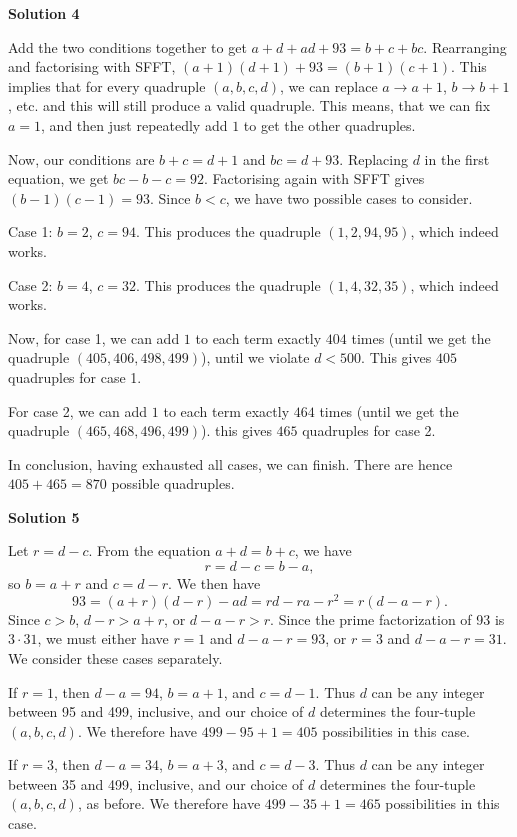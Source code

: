 \begin{enumerate}
\textbf{Solution 4}

Add the two conditions together to get $a+d+ad+93=b+c+bc$. Rearranging and factorising with SFFT, $(a+1)(d+1)+93=(b+1)(c+1)$. This implies that for every quadruple $(a,b,c,d)$, we can replace $a\longrightarrow a+1$, $b\longrightarrow b+1$, etc. and this will still produce a valid quadruple. This means, that we can fix $a=1$, and then just repeatedly add $1$ to get the other quadruples. 

 Now, our conditions are $b+c=d+1$ and $bc=d+93$. Replacing $d$ in the first equation, we get $bc-b-c=92$. Factorising again with SFFT gives $(b-1)(c-1)=93$. Since $b<c$, we have two possible cases to consider.

 Case 1: $b=2$, $c=94$. This produces the quadruple $(1,2,94,95)$, which indeed works.

 Case 2: $b=4$, $c=32$. This produces the quadruple $(1,4,32,35)$, which indeed works. 

 Now, for case 1, we can add $1$ to each term exactly $404$ times (until we get the quadruple $(405,406,498,499)$), until we violate $d<500$. This gives $405$ quadruples for case 1.

 For case 2, we can add $1$ to each term exactly $464$ times (until we get the quadruple $(465,468,496,499)$). this gives $465$ quadruples for case 2.

 In conclusion, having exhausted all cases, we can finish. There are hence $405+465=\boxed{870}$ possible quadruples.

 



\textbf{Solution 5}

Let $r = d-c$. From the equation $a+d = b+c$, we have 
 \[r = d-c = b-a ,\] so $b = a+r$ and $c = d-r$. We then have 
 \[93 = (a+r)(d-r) - ad = rd - ra - r^2 = r(d-a-r) .\] Since $c > b$, $d-r > a+r$, or $d-a-r > r$. Since the prime factorization of 93 is $3 \cdot 31$, we must either have $r=1$ and $d-a-r = 93$, or $r=3$ and $d-a-r = 31$. We consider these cases separately.

 If $r=1$, then $d-a = 94$, $b= a+1$, and $c = d-1$. Thus $d$ can be any integer between 95 and 499, inclusive, and our choice of $d$ determines the four-tuple $(a,b,c,d)$. We therefore have $499-95+1 = 405$ possibilities in this case.

 If $r=3$, then $d-a = 34$, $b = a+3$, and $c=d-3$. Thus $d$ can be any integer between 35 and 499, inclusive, and our choice of $d$ determines the four-tuple $(a,b,c,d)$, as before. We therefore have $499-35+1 = 465$ possibilities in this case.


\end{enumerate}
